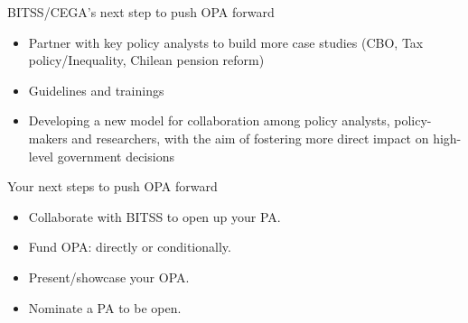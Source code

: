 \documentclass{beamer}
\begin{document}
\begin{frame}{Discussion}

\end{itemize}
\end{frame}

\begin{frame}{BITSS/CEGA's next step to push OPA forward}
\begin{itemize}
\item Partner with key policy analysts to build more case studies (CBO, Tax policy/Inequality, Chilean pension reform)
\item Guidelines and trainings
\item Developing a new model for collaboration among policy analysts, policy-makers and researchers, with the aim of fostering more direct impact on high-level government decisions
\end{itemize}
\end{frame}

\begin{frame}{Your next steps to push OPA forward}
\begin{itemize}
\item Collaborate with BITSS to open up your PA. 
\item Fund OPA: directly or conditionally.
\item Present/showcase your OPA. 
\item Nominate a PA to be open. 
\end{itemize}
\end{frame}
\end{document}
